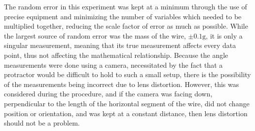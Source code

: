 The random error in this experiment was kept at a minimum through the use of precise equipment and minimizing the number of variables which needed to be multiplied together, reducing the scale factor of error as much as possible. 
While the largest source of random error was the mass of the wire, $\pm0.1\si{\gram}$, it is only a singular measurement, meaning that its true measurement affects every data point, thus not affecting the mathematical relationship.
Because the angle measurements were done using a camera, necessitated by the fact that a protractor would be difficult to hold to such a small setup, there is the possibility of the measurements being incorrect due to lens distortion.
However, this was considered during the procedure, and if the camera was facing down, perpendicular to the length of the horizontal segment of the wire, did not change position or orientation, and was kept at a constant distance, then lens distortion should not be a problem.
